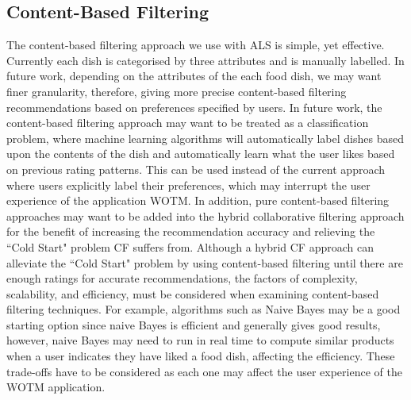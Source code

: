 \subsection{Content-Based Filtering}
The content-based filtering approach we use with ALS is simple, yet effective. Currently each dish is categorised by three attributes and is manually labelled. In future work, depending on the attributes of the each food dish, we may want finer granularity, therefore, giving more precise content-based filtering recommendations based on preferences specified by users.  In future work, the content-based filtering approach may want to be treated as a classification problem, where machine learning algorithms will automatically label dishes based upon the contents of the dish and automatically learn what the user likes based on previous rating patterns. This can be used instead of the current approach where users explicitly label their preferences, which may interrupt the user experience of the application WOTM. In addition, pure content-based filtering approaches may want to be added into the hybrid collaborative filtering approach for the benefit of increasing the recommendation accuracy and relieving the ``Cold Start" problem CF suffers from. Although a hybrid CF approach can alleviate the ``Cold Start" problem by using content-based filtering until there are enough ratings for accurate recommendations, the factors of complexity, scalability, and efficiency, must be considered when examining content-based filtering techniques. For example, algorithms such as Naive Bayes may be a good starting option since naive Bayes is efficient and generally gives good results, however, naive Bayes may need to run in real time to compute similar products when a user indicates they have liked a food dish, affecting the efficiency. These trade-offs have to be considered as each one may affect the user experience of the WOTM application. 

